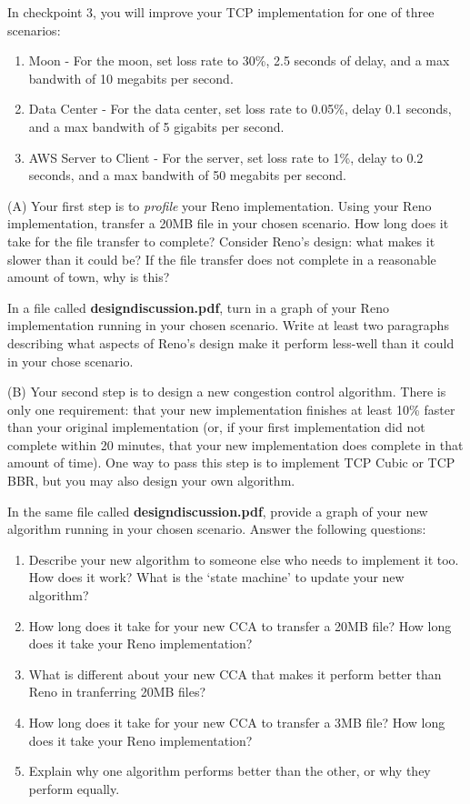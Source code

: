 In checkpoint 3, you will improve your TCP implementation for one of three scenarios:
\begin{enumerate}
    \item Moon - For the moon, set loss rate to 30\%, 2.5 seconds of delay, and a max bandwith of 10 megabits per second. 
    \item Data Center - For the data center, set loss rate to 0.05\%, delay 0.1 seconds, and a max bandwith of 5 gigabits per second. 
    \item AWS Server to Client - For the server, set loss rate to 1\%, delay to 0.2 seconds, and a max bandwith of 50 megabits per second. 
\end{enumerate}

\noindent (A) Your first step is to {\it profile} your Reno implementation. Using your Reno implementation, transfer a 20MB file in your chosen scenario. How long does it take for the file transfer to complete? Consider Reno's design: what makes it slower than it could be? If the file transfer does not complete in a reasonable amount of town, why is this?

 In a file called {\bf designdiscussion.pdf}, turn in a graph of your Reno implementation running in your chosen scenario. Write at least two paragraphs describing what aspects of Reno's design make it perform less-well than it could in your chose scenario. 

\vspace{10pt}

\noindent (B) Your second step is to design a new congestion control algorithm. There is only one requirement: that your new implementation finishes at least 10\% faster than your original implementation (or, if your first implementation did not complete within 20 minutes, that your new implementation does complete in that amount of time). One way to pass this step is to implement TCP Cubic or TCP BBR, but you may also design your own algorithm.

 In the same file called {\bf designdiscussion.pdf}, provide a graph of your new algorithm running in your chosen scenario. Answer the following questions:
\begin{enumerate}
    \item Describe your new algorithm to someone else who needs to implement it too. How does it work? What is the `state machine' to update your new algorithm?
    \item How long does it take for your new CCA to transfer a 20MB file? How long does it take your Reno implementation?
    \item What is different about your new CCA that makes it perform better than Reno in tranferring 20MB files?
    \item How long does it take for your new CCA to transfer a 3MB file? How long does it take your Reno implementation?
    \item Explain why one algorithm performs better than the other, or why they perform equally.
\end{enumerate}

